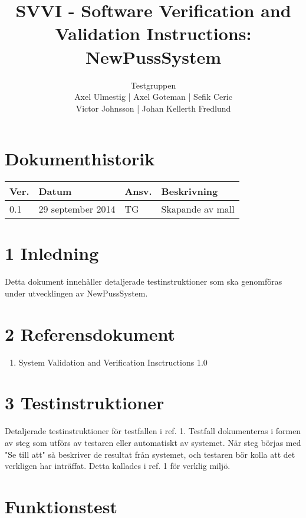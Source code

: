 \documentclass[a4paper]{article}
\title{SVVI - Software Verification and Validation Instructions: NewPussSystem}
\author{Testgruppen \\ Axel Ulmestig | Axel Goteman | Sefik Ceric \\ Victor Johnsson | Johan Kellerth Fredlund}
\date{}
\begin{document}
\maketitle
\thispagestyle{fancy}
\tableofcontents
\newpage

\section*{Dokumenthistorik}

\begin{tabular}{ l l l p{9cm} }
Ver. & Datum & Ansv. & Beskrivning \\\hline
0.1 & 29 september 2014 & TG & Skapande av mall \\

\end{tabular}
\section{1 Inledning}       

Detta dokument innehåller detaljerade testinstruktioner som ska genomföras under utvecklingen av NewPussSystem.

\section{2 Referensdokument}
\begin{enumerate}
\item System Validation and Verification Insctructions 1.0
\end{enumerate}



\section{3 Testinstruktioner}
Detaljerade testinstruktioner för testfallen i ref. 1. Testfall dokumenteras i formen av steg som utförs av testaren eller automatiskt av systemet. När steg börjas med "Se till att" så beskriver de resultat från systemet, och testaren bör kolla att det verkligen har inträffat. Detta kallades i ref. 1 för verklig miljö.

\section{Funktionstest}
\end{document}
